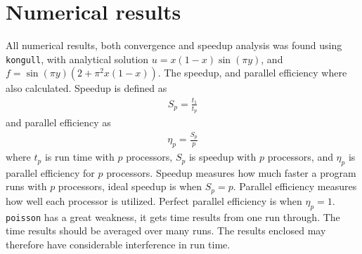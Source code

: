 \documentclass{article}
\begin{document}
\section{Numerical results}
All numerical results, both convergence and speedup analysis was found using \texttt{kongull}, with analytical solution $ u = x(1-x) \sin( \pi y) $, and $f = \sin(\pi y) (2+\pi^2x(1-x))$. The speedup, and parallel efficiency where also calculated. Speedup is defined as
\begin{align*}
S_p = \frac{t_1}{t_p}
\end{align*}
and parallel efficiency as
\begin{align*}
\eta_p = \frac{S_p}{p}
\end{align*}
where $t_p$ is run time with $p$ processors, $S_p$ is speedup with $p$ processors, and $\eta_p$ is parallel efficiency for $p$ processors. Speedup measures how much faster a program runs with $p$ processors, ideal speedup is when $S_p = p$. Parallel efficiency measures how well each processor is utilized. Perfect parallel efficiency is when $\eta_p = 1$. \\
\texttt{poisson} has a great weakness, it gets time results from one run through. The time results should be averaged over many runs. The results enclosed may therefore have considerable interference in run time.
\end{document}

